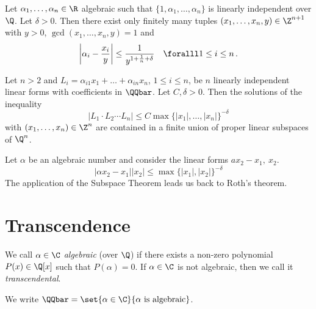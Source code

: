 \begin{thm*}
	Let \( \alpha_1, \dotsc, \alpha_n \in \R \) algebraic such that \( \{1, \alpha_1, \dotsc, \alpha_n\} \) is linearly independent over \( \Q \).
	Let \( \delta > 0 \).
	Then there exist only finitely many tuples \( (x_1, \dotsc, x_n, y) \in \Z^{n+1} \) with \( y>0 \), \( \gcd(x_1, \dotsc, x_n, y)=1 \) and
	\[ \left| \alpha_i - \frac{x_i}{y} \right| \leq \frac{1}{y^{1+\frac{1}{n} + \delta}} \quad \foralll 1 \leq i \leq n \,. \]
\end{thm*}

\begin{thm*}
	Let \( n>2 \) and \( L_i = \alpha_{i1} x_1 + \dots + \alpha_{in}x_n \), \( 1 \leq i \leq n \), be \( n \) linearly independent linear forms with coefficients in \( \QQbar \).
	Let \( C, \delta > 0 \).
	Then the solutions of the inequality
	\[ \left| L_1 \cdot L_2 \dotsm L_n \right| \leq C \max \{|x_1|, \dotsc, |x_n|\}^{-\delta} \]
	with \( (x_1, \dotsc, x_n) \in \Z^n \) are contained in a finite union of proper linear subspaces of \( \Q^n \).
\end{thm*}

\begin{exmp*}
	Let \( \alpha \) be an algebraic number and consider the linear forms \( ax_2 - x_1,\ x_2 \).
	\[ |\alpha x_2 - x_1| |x_2| \leq \max \{|x_1|, |x_2|\}^{-\delta} \]
	The application of the Subspace Theorem leads us back to Roth's theorem.
\end{exmp*}


\section{Transcendence}\label{sec:4.2}

\begin{defn*}
	We call \( \alpha \in \C \) \emph{algebraic} (over \( \Q \)) if there exists a non-zero polynomial \( P(x) \in \Q[x] \) such that \( P(\alpha) = 0 \).
	If \( \alpha \in \C \) is not algebraic, then we call it \emph{transcendental}.
\end{defn*}

\begin{notat*}
	We write \( \QQbar = \set{\alpha \in \C}{\alpha \ \text{is algebraic}} \).
\end{notat*}

